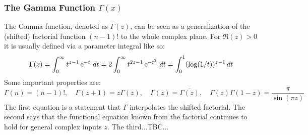 \subsubsection{The Gamma Function $\Gamma(x)$}
The Gamma function, denoted as $\Gamma(z)$, can be seen as a generalization of the (shifted) factorial function $(n-1)!$ to the whole complex plane. For $\Re(z)>0$ it is usually defined via a parameter integral like so:
\begin{equation}
\Gamma(z) =	\int_{0}^{\infty} t^{z-1} \operatorname{\mathrm{e}}^{-t} \, dt 
          = 2 \int_{0}^{\infty} t^{2z-1} \operatorname{\mathrm{e}}^{-t^2} \, dt 
          = \int_{0}^{1} (\log(1/t))^{z-1}  \, dt 	
\end{equation}
Some important properties are:
\begin{equation}
\Gamma(n) = (n-1)!, \quad	
\Gamma(z+1) = z \Gamma(z), \quad
\Gamma(\overline{z}) = \overline{\Gamma(z)}, \quad
\Gamma(z) \Gamma(1-z) = \frac{\pi}{\sin(\pi z)}
\end{equation}
The first equation is a statement that $\Gamma$ interpolates the shifted factorial. The second says that the functional equation known from the factorial continues to hold for general complex inputs $z$. The third...TBC...








